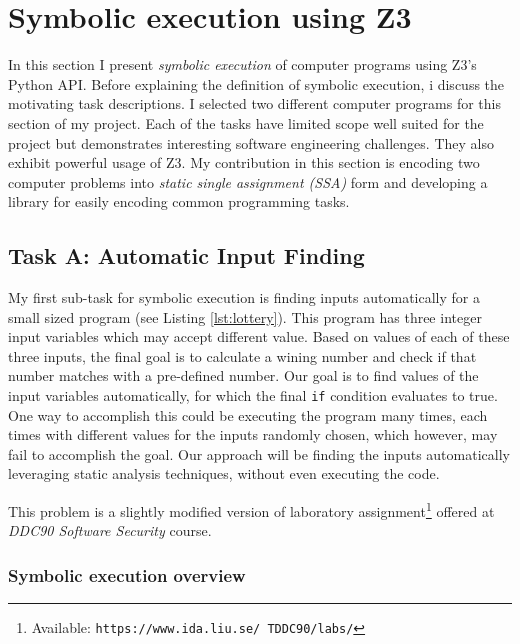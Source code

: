 \documentclass{sig-alternate-05-2015}
\begin{document}
\section{Symbolic execution using Z3}

In this section I present \textit{symbolic execution} of computer programs using 
Z3's Python API. Before explaining the definition of symbolic execution, i discuss 
the motivating task descriptions. I selected two different computer programs for this 
section of my project. Each of the tasks have limited scope well suited for the 
project but demonstrates interesting software engineering challenges. They also 
exhibit powerful usage of Z3. My contribution in this section is encoding 
two computer problems into \textit{static single assignment (SSA)} form and 
developing a library for easily encoding common programming tasks.

\subsection{Task A: Automatic Input Finding} \label{taskA}

My first sub-task for symbolic execution is finding inputs automatically for a 
small sized program (see Listing \ref{lst:lottery}). This program has three 
integer input variables which may accept different value. Based on values of 
each of these three inputs, the final goal is to calculate a wining number and 
check if that number matches with a pre-defined number. Our goal is to find values 
of the input variables automatically, for which the final \texttt{if} condition 
evaluates to true. One way to accomplish this could be executing the program many 
times, each times with different values for the inputs randomly chosen, which however, 
may fail to accomplish the goal. Our approach will be finding the inputs automatically 
leveraging static analysis techniques, without even executing the code.

This problem is a slightly modified version of laboratory assignment\footnote{Available: 
\texttt{https://www.ida.liu.se/~TDDC90/labs/}} offered at \textit{DDC90 Software Security} course\cite{online:tddc}.



\subsubsection{Symbolic execution overview}
\end{document}
